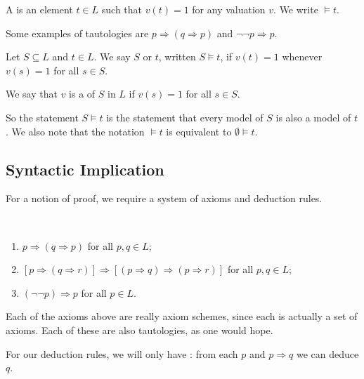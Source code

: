 \documentclass[a4paper]{scrartcl}
\begin{document}
\begin{definition}[Tautology]
  A  is an element $t \in L$ such that $v(t) = 1$ for any valuation $v$. We write $\models t$.
\end{definition}

Some examples of tautologies are $p \Rightarrow (q \Rightarrow p)$ and $\lnot \lnot p \Rightarrow p$.

\begin{definition}
  Let $S \subseteq L$ and $t \in L$. We say $S$  or  $t$, written $S \models t$, if $v(t) = 1$ whenever $v(s) = 1$ for all $s \in S$.
\end{definition}
\begin{definition}[Model]
  We say that $v$ is a  of $S$ in $L$ if $v(s) = 1$ for all $s \in S$.
\end{definition}

So the statement $S \models t$ is the statement that every model of $S$ is also a model of $t$. We also note that the notation $\models t$ is equivalent to $\emptyset \models t$.

\subsection{Syntactic Implication}

For a notion of proof, we require a system of axioms and deduction rules.

\begin{axiom}~
  \vspace{-1.5\baselineskip}
  \begin{enumerate}
    \item $p \Rightarrow (q \Rightarrow p)$ for all $p, q \in L$;
    \item $[p \Rightarrow (q \Rightarrow r)] \Rightarrow [(p \Rightarrow q) \Rightarrow (p \Rightarrow r)]$ for all $p, q \in L$;
    \item $(\lnot \lnot p) \Rightarrow p$ for all $p \in L$.
  \end{enumerate}
\end{axiom}

Each of the axioms above are really axiom schemes, since each is actually a set of axioms. Each of these are also tautologies, as one would hope.

For our deduction rules, we will only have : from each $p$ and $p \Rightarrow q$ we can deduce $q$.
\end{document}
